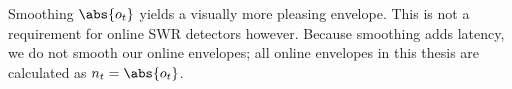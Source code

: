 Smoothing $\abs{o_t}$ yields a visually more pleasing envelope. This is not a requirement for online SWR detectors however. Because smoothing adds latency, we do not smooth our online envelopes; all online envelopes in this thesis are calculated as $n_t = \abs{o_t}$.










\clearpage
\begin{figure}
\end{figure}

\begin{figure}
\end{figure}
